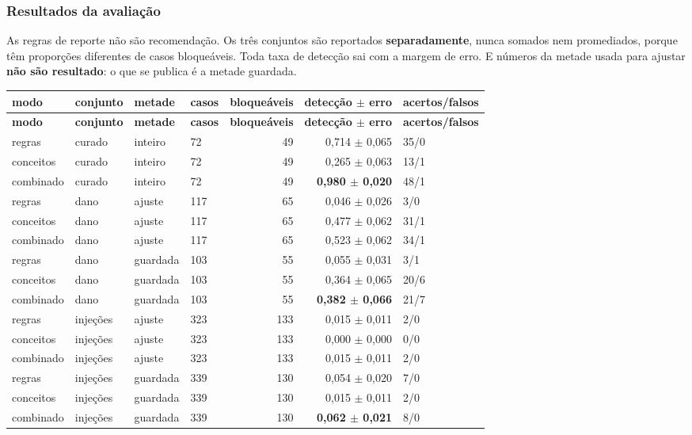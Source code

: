 \documentclass[10pt]{article}
\begin{document}
\subsubsection{Resultados da avaliação}

As regras de reporte não são recomendação. Os três conjuntos são reportados \textbf{separadamente}, nunca somados nem promediados, porque têm proporções diferentes de casos bloqueáveis. Toda taxa de detecção sai com a margem de erro. E números da metade usada para ajustar \textbf{não são resultado}: o que se publica é a metade guardada.

{\scriptsize
\begin{longtable}{llllrrl}
\toprule
\textbf{modo} & \textbf{conjunto} & \textbf{metade} & \textbf{casos} & \textbf{bloqueáveis} & \textbf{detecção $\pm$ erro} & \textbf{acertos/falsos} \\
\midrule
\endfirsthead
\toprule
\textbf{modo} & \textbf{conjunto} & \textbf{metade} & \textbf{casos} & \textbf{bloqueáveis} & \textbf{detecção $\pm$ erro} & \textbf{acertos/falsos} \\
\midrule
\endhead
\bottomrule
\endfoot
regras & curado & inteiro & 72 & 49 & 0,714 $\pm$ 0,065 & 35/0 \\
conceitos & curado & inteiro & 72 & 49 & 0,265 $\pm$ 0,063 & 13/1 \\
combinado & curado & inteiro & 72 & 49 & \textbf{0,980 $\pm$ 0,020} & 48/1 \\
regras & dano & ajuste & 117 & 65 & 0,046 $\pm$ 0,026 & 3/0 \\
conceitos & dano & ajuste & 117 & 65 & 0,477 $\pm$ 0,062 & 31/1 \\
combinado & dano & ajuste & 117 & 65 & 0,523 $\pm$ 0,062 & 34/1 \\
regras & dano & guardada & 103 & 55 & 0,055 $\pm$ 0,031 & 3/1 \\
conceitos & dano & guardada & 103 & 55 & 0,364 $\pm$ 0,065 & 20/6 \\
combinado & dano & guardada & 103 & 55 & \textbf{0,382 $\pm$ 0,066} & 21/7 \\
regras & injeções & ajuste & 323 & 133 & 0,015 $\pm$ 0,011 & 2/0 \\
conceitos & injeções & ajuste & 323 & 133 & 0,000 $\pm$ 0,000 & 0/0 \\
combinado & injeções & ajuste & 323 & 133 & 0,015 $\pm$ 0,011 & 2/0 \\
regras & injeções & guardada & 339 & 130 & 0,054 $\pm$ 0,020 & 7/0 \\
conceitos & injeções & guardada & 339 & 130 & 0,015 $\pm$ 0,011 & 2/0 \\
combinado & injeções & guardada & 339 & 130 & \textbf{0,062 $\pm$ 0,021} & 8/0 \\
\end{longtable}}
\end{document}
